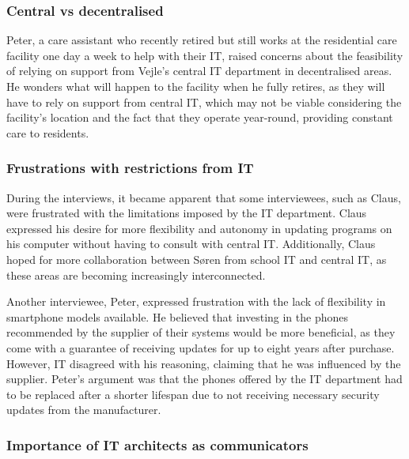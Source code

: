 \documentclass[
]{book}
\begin{document}
\hypertarget{central-vs-decentralised}{%
\subsubsection{Central vs decentralised}\label{central-vs-decentralised}}

Peter, a care assistant who recently retired but still works at the residential care facility one day a week to help with their IT, raised concerns about the feasibility of relying on support from Vejle's central IT department in decentralised areas. He wonders what will happen to the facility when he fully retires, as they will have to rely on support from central IT, which may not be viable considering the facility's location and the fact that they operate year-round, providing constant care to residents.

\hypertarget{frustrations-with-restrictions-from-it}{%
\subsubsection{Frustrations with restrictions from IT}\label{frustrations-with-restrictions-from-it}}

During the interviews, it became apparent that some interviewees, such as Claus, were frustrated with the limitations imposed by the IT department. Claus expressed his desire for more flexibility and autonomy in updating programs on his computer without having to consult with central IT. Additionally, Claus hoped for more collaboration between Søren from school IT and central IT, as these areas are becoming increasingly interconnected.

Another interviewee, Peter, expressed frustration with the lack of flexibility in smartphone models available. He believed that investing in the phones recommended by the supplier of their systems would be more beneficial, as they come with a guarantee of receiving updates for up to eight years after purchase. However, IT disagreed with his reasoning, claiming that he was influenced by the supplier. Peter's argument was that the phones offered by the IT department had to be replaced after a shorter lifespan due to not receiving necessary security updates from the manufacturer.

\hypertarget{importance-of-it-architects-as-communicators}{%
\subsubsection{Importance of IT architects as communicators}\label{importance-of-it-architects-as-communicators}}
\end{document}
